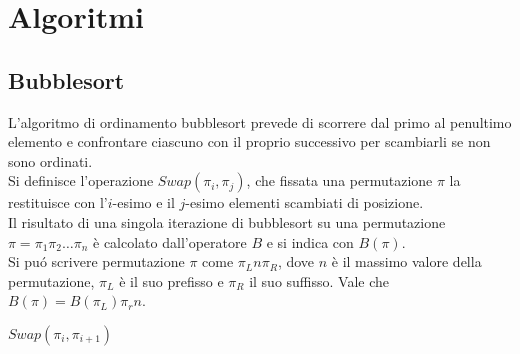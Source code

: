 \section{Algoritmi}
\subsection{Bubblesort}
L'algoritmo di ordinamento bubblesort prevede di scorrere dal primo al penultimo elemento e confrontare ciascuno con il proprio successivo per scambiarli se non sono ordinati.\\
Si definisce l'operazione $Swap(\pi_i,\pi_j)$, che fissata una permutazione $\pi$ la restituisce con l'$i$-esimo e il $j$-esimo elementi scambiati di posizione. \\
Il risultato di una singola iterazione di bubblesort su una permutazione $\pi=\pi_1\pi_2\dots\pi_n$ \`e calcolato dall'operatore $B$ e si indica con $B(\pi)$.\\
Si pu\'o scrivere permutazione $\pi$ come $\pi_Ln\pi_R$, dove $n$ \`e il massimo valore della permutazione, $\pi_L$ \`e il suo prefisso e $\pi_R$ il suo suffisso. Vale che $B(\pi) = B(\pi_L)\pi_rn$.\\
\begin{algorithm}[H]
   \caption{$B - bubblesort$}
\begin{algorithmic}[1]
   \State $Swap(\pi_i,\pi_{i+1})$
   \EndIf
   \EndFor
\end{algorithmic}
\end{algorithm}
